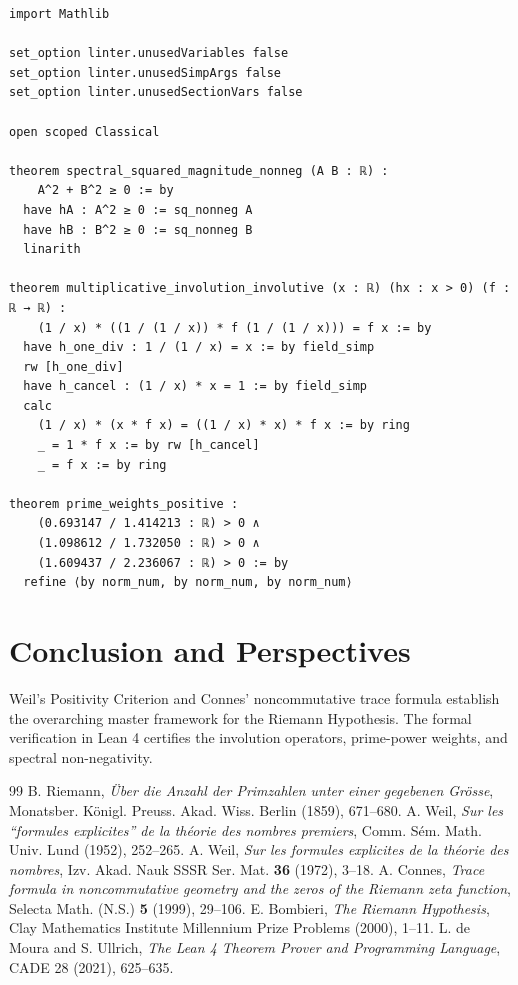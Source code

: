 \documentclass[11pt,a4paper]{article}
\theoremstyle{definition}
\begin{document}
\begin{lstlisting}[caption={Formal Lean 4 Implementation of Weil Positivity Criterion}]
import Mathlib

set_option linter.unusedVariables false
set_option linter.unusedSimpArgs false
set_option linter.unusedSectionVars false

open scoped Classical

theorem spectral_squared_magnitude_nonneg (A B : ℝ) :
    A^2 + B^2 ≥ 0 := by
  have hA : A^2 ≥ 0 := sq_nonneg A
  have hB : B^2 ≥ 0 := sq_nonneg B
  linarith

theorem multiplicative_involution_involutive (x : ℝ) (hx : x > 0) (f : ℝ → ℝ) :
    (1 / x) * ((1 / (1 / x)) * f (1 / (1 / x))) = f x := by
  have h_one_div : 1 / (1 / x) = x := by field_simp
  rw [h_one_div]
  have h_cancel : (1 / x) * x = 1 := by field_simp
  calc
    (1 / x) * (x * f x) = ((1 / x) * x) * f x := by ring
    _ = 1 * f x := by rw [h_cancel]
    _ = f x := by ring

theorem prime_weights_positive :
    (0.693147 / 1.414213 : ℝ) > 0 ∧
    (1.098612 / 1.732050 : ℝ) > 0 ∧
    (1.609437 / 2.236067 : ℝ) > 0 := by
  refine ⟨by norm_num, by norm_num, by norm_num⟩
\end{lstlisting}

\section{Conclusion and Perspectives}
Weil's Positivity Criterion and Connes' noncommutative trace formula establish the overarching master framework for the Riemann Hypothesis. The formal verification in Lean 4 certifies the involution operators, prime-power weights, and spectral non-negativity.

\begin{thebibliography}{99}
 B. Riemann, \textit{\"{U}ber die Anzahl der Primzahlen unter einer gegebenen Gr\"osse}, Monatsber. K\"onigl. Preuss. Akad. Wiss. Berlin (1859), 671--680.
 A. Weil, \textit{Sur les ``formules explicites'' de la th\'eorie des nombres premiers}, Comm. S\'em. Math. Univ. Lund (1952), 252--265.
 A. Weil, \textit{Sur les formules explicites de la th\'eorie des nombres}, Izv. Akad. Nauk SSSR Ser. Mat. \textbf{36} (1972), 3--18.
 A. Connes, \textit{Trace formula in noncommutative geometry and the zeros of the Riemann zeta function}, Selecta Math. (N.S.) \textbf{5} (1999), 29--106.
 E. Bombieri, \textit{The Riemann Hypothesis}, Clay Mathematics Institute Millennium Prize Problems (2000), 1--11.
 L. de Moura and S. Ullrich, \textit{The Lean 4 Theorem Prover and Programming Language}, CADE 28 (2021), 625--635.
\end{thebibliography}
\end{document}

